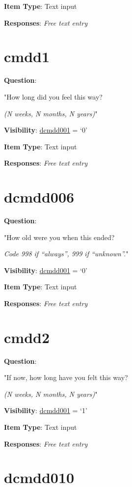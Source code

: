 \documentclass[]{book}
\begin{document}
\textbf{Item Type}: Text input

\textbf{Responses}: \emph{Free text entry}

\hypertarget{cmdd1}{%
\section{cmdd1}\label{cmdd1}}

\textbf{Question}:

"How long did you feel this way?

\emph{(N weeks, N months, N years)}"

\textbf{Visibility}: \protect\hyperlink{dcmdd001}{dcmdd001} = `0'

\textbf{Item Type}: Text input

\textbf{Responses}: \emph{Free text entry}

\hypertarget{dcmdd006}{%
\section{dcmdd006}\label{dcmdd006}}

\textbf{Question}:

"How old were you when this ended?

\emph{Code 998 if ``always'', 999 if ``unknown''.}"

\textbf{Visibility}: \protect\hyperlink{dcmdd001}{dcmdd001} = `0'

\textbf{Item Type}: Text input

\textbf{Responses}: \emph{Free text entry}

\hypertarget{cmdd2}{%
\section{cmdd2}\label{cmdd2}}

\textbf{Question}:

"If now, how long have you felt this way?

\emph{(N weeks, N months, N years)}"

\textbf{Visibility}: \protect\hyperlink{dcmdd001}{dcmdd001} = `1'

\textbf{Item Type}: Text input

\textbf{Responses}: \emph{Free text entry}

\hypertarget{dcmdd010}{%
\section{dcmdd010}\label{dcmdd010}}
\end{document}
